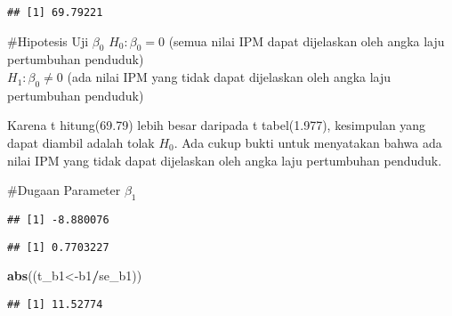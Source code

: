 \documentclass[
]{article}
\newenvironment{Shaded}{\begin{snugshade}}{\end{snugshade}}
\newcommand{\AttributeTok}[1]{\textcolor[rgb]{0.13,0.29,0.53}{#1}}
\newcommand{\DecValTok}[1]{\textcolor[rgb]{0.00,0.00,0.81}{#1}}
\newcommand{\FunctionTok}[1]{\textcolor[rgb]{0.13,0.29,0.53}{\textbf{#1}}}
\newcommand{\NormalTok}[1]{#1}
\newcommand{\OtherTok}[1]{\textcolor[rgb]{0.56,0.35,0.01}{#1}}
\newcommand{\SpecialCharTok}[1]{\textcolor[rgb]{0.81,0.36,0.00}{\textbf{#1}}}
\newcommand{\StringTok}[1]{\textcolor[rgb]{0.31,0.60,0.02}{#1}}
\begin{document}
\begin{verbatim}
## [1] 69.79221
\end{verbatim}

\#Hipotesis Uji \(\beta_0\) \(H_0:\beta_0=0\) (semua nilai IPM dapat
dijelaskan oleh angka laju pertumbuhan penduduk)\\
\(H_1:\beta_0≠0\) (ada nilai IPM yang tidak dapat dijelaskan oleh angka
laju pertumbuhan penduduk)

Karena t hitung(69.79) lebih besar daripada t tabel(1.977), kesimpulan
yang dapat diambil adalah tolak \(H_0\). Ada cukup bukti untuk
menyatakan bahwa ada nilai IPM yang tidak dapat dijelaskan oleh angka
laju pertumbuhan penduduk.

\#Dugaan Parameter \(\beta_1\)

\begin{Shaded}
\end{Shaded}

\begin{verbatim}
## [1] -8.880076
\end{verbatim}

\begin{Shaded}
\end{Shaded}

\begin{verbatim}
## [1] 0.7703227
\end{verbatim}

\begin{Shaded}
\begin{Highlighting}[]
\FunctionTok{abs}\NormalTok{((t\_b1}\OtherTok{\textless{}{-}}\NormalTok{b1}\SpecialCharTok{/}\NormalTok{se\_b1))}
\end{Highlighting}
\end{Shaded}

\begin{verbatim}
## [1] 11.52774
\end{verbatim}
\end{document}
